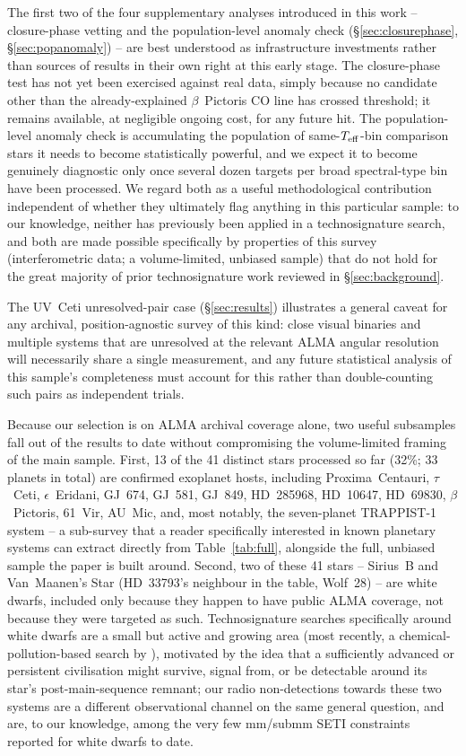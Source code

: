 \documentclass{openjournal}
\begin{document}
The first two of the four supplementary analyses introduced in this work
-- closure-phase vetting and the population-level anomaly check
(\S\ref{sec:closurephase}, \S\ref{sec:popanomaly}) -- are best understood
as infrastructure investments rather than sources of results in their
own right at this early stage. The closure-phase test has not yet been
exercised against real data, simply because no candidate other than the
already-explained $\beta$~Pictoris CO line has crossed threshold; it
remains available, at negligible ongoing cost, for any future hit. The
population-level anomaly check is accumulating the population of
same-$T_{\rm eff}$-bin comparison stars it needs to become statistically
powerful, and we expect it to become genuinely diagnostic only once
several dozen targets per broad spectral-type bin have been processed.
We regard both as a useful methodological contribution independent of
whether they ultimately flag anything in this particular sample: to our
knowledge, neither has previously been applied in a technosignature
search, and both are made possible specifically by properties of this
survey (interferometric data; a volume-limited, unbiased sample) that do
not hold for the great majority of prior technosignature work reviewed in
\S\ref{sec:background}.

The UV~Ceti unresolved-pair case (\S\ref{sec:results}) illustrates a
general caveat for any archival, position-agnostic survey of this kind:
close visual binaries and multiple systems that are unresolved at the
relevant ALMA angular resolution will necessarily share a single
measurement, and any future statistical analysis of this sample's
completeness must account for this rather than double-counting such
pairs as independent trials.

Because our selection is on ALMA archival coverage alone, two useful
subsamples fall out of the results to date without compromising the
volume-limited framing of the main sample. First, 13 of the 41 distinct
stars processed so far (32\%; 33 planets in total) are confirmed
exoplanet hosts, including Proxima~Centauri, $\tau$~Ceti, $\epsilon$~Eridani,
GJ~674, GJ~581, GJ~849, HD~285968, HD~10647, HD~69830,
$\beta$~Pictoris, 61~Vir, AU~Mic,
and, most notably, the seven-planet TRAPPIST-1 system -- a sub-survey
that a reader specifically interested in known planetary systems can
extract directly from Table~\ref{tab:full}, alongside the full, unbiased
sample the paper is built around. Second, two of these 41 stars --
Sirius~B and Van~Maanen's Star (HD~33793's neighbour in the table,
Wolf~28) -- are white dwarfs, included only because they happen to have
public ALMA coverage, not because they were targeted as such.
Technosignature searches specifically around white dwarfs are a small
but active and growing area (most recently, a chemical-pollution-based
search by \citealt{PollutedWD2026}), motivated by the idea that a
sufficiently advanced or persistent civilisation might survive, signal
from, or be detectable around its star's post-main-sequence remnant;
our radio non-detections towards these two systems are a different
observational channel on the same general question, and are, to our
knowledge, among the very few mm/submm SETI constraints reported for
white dwarfs to date.
\end{document}
